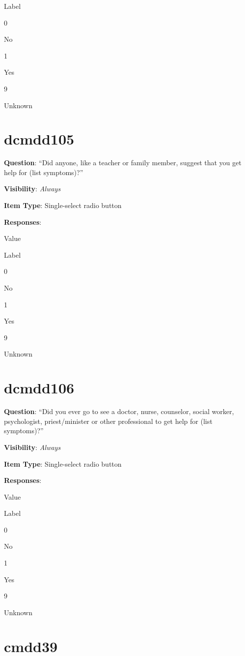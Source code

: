 \documentclass[]{book}
\begin{document}
Label

0

No

1

Yes

9

Unknown

\hypertarget{dcmdd105}{%
\section{dcmdd105}\label{dcmdd105}}

\textbf{Question}: ``Did anyone, like a teacher or family member, suggest that you get help for (list symptoms)?''

\textbf{Visibility}: \emph{Always}

\textbf{Item Type}: Single-select radio button

\textbf{Responses}:

Value

Label

0

No

1

Yes

9

Unknown

\hypertarget{dcmdd106}{%
\section{dcmdd106}\label{dcmdd106}}

\textbf{Question}: ``Did you ever go to see a doctor, nurse, counselor, social worker, psychologist, priest/minister or other professional to get help for (list symptoms)?''

\textbf{Visibility}: \emph{Always}

\textbf{Item Type}: Single-select radio button

\textbf{Responses}:

Value

Label

0

No

1

Yes

9

Unknown

\hypertarget{cmdd39}{%
\section{cmdd39}\label{cmdd39}}
\end{document}
